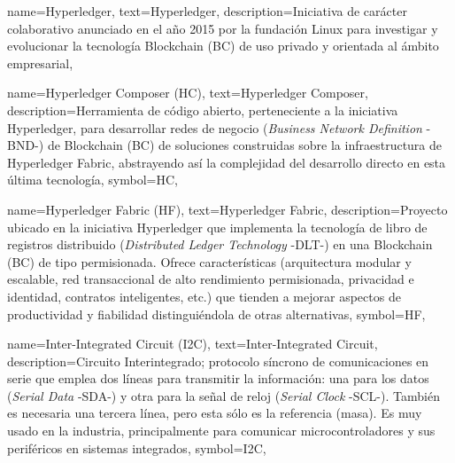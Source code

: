 {
    name={Hyperledger},
    text={Hyperledger},
    description={Iniciativa de carácter colaborativo anunciado en el año 2015 por la fundación Linux para investigar y evolucionar la tecnología Blockchain (BC) de uso privado y orientada al ámbito empresarial},
}

{
    name={Hyperledger Composer (HC)},
    text={Hyperledger Composer},
    description={Herramienta de código abierto, perteneciente a la iniciativa Hyperledger, para desarrollar redes de negocio (\textit{Business Network Definition} -BND-) de Blockchain (BC) de soluciones construidas sobre la infraestructura de Hyperledger Fabric, abstrayendo así la complejidad del desarrollo directo en esta última tecnología},
    symbol={HC},
}

{
    name={Hyperledger Fabric (HF)},
    text={Hyperledger Fabric},
    description={Proyecto ubicado en la iniciativa Hyperledger que implementa la tecnología de libro de registros distribuido (\textit{Distributed Ledger Technology} -DLT-) en una Blockchain (BC) de tipo permisionada. Ofrece características (arquitectura modular y escalable, red transaccional de alto rendimiento permisionada, privacidad e identidad, contratos inteligentes, etc.) que tienden a mejorar aspectos de productividad y fiabilidad distinguiéndola de otras alternativas},
    symbol={HF},
}

{
    name={Inter-Integrated Circuit (I2C)},
    text={Inter-Integrated Circuit},
    description={Circuito Interintegrado; protocolo síncrono de comunicaciones en serie que emplea dos líneas para transmitir la información: una para los datos (\textit{Serial Data} -SDA-) y otra para la señal de reloj (\textit{Serial Clock} -SCL-). También es necesaria una tercera línea, pero esta sólo es la referencia (masa). Es muy usado en la industria, principalmente para comunicar microcontroladores y sus periféricos en sistemas integrados},
    symbol={I2C},
}

